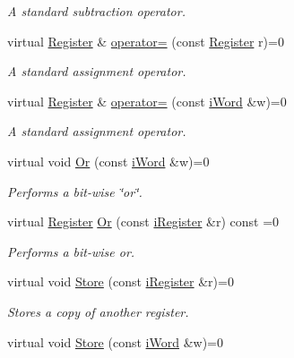 \begin{DoxyCompactItemize}
\begin{DoxyCompactList}\small\item\em A standard subtraction operator. \item\end{DoxyCompactList}\item 
virtual \hyperlink{classRegister}{Register} \& \hyperlink{classiRegister_a3280dc5af6b828d875c57c3a3eac54d9}{operator=} (const \hyperlink{classRegister}{Register} r)=0
\begin{DoxyCompactList}\small\item\em A standard assignment operator. \item\end{DoxyCompactList}\item 
virtual \hyperlink{classRegister}{Register} \& \hyperlink{classiRegister_a16bf3f305a9588ddc85c109ac9a8b47b}{operator=} (const \hyperlink{classiWord}{iWord} \&w)=0
\begin{DoxyCompactList}\small\item\em A standard assignment operator. \item\end{DoxyCompactList}\item 
virtual void \hyperlink{classiRegister_aa0eac4fe58bde4a280a42fda1c087eee}{Or} (const \hyperlink{classiWord}{iWord} \&w)=0
\begin{DoxyCompactList}\small\item\em Performs a bit-\/wise \char`\"{}or\char`\"{}. \item\end{DoxyCompactList}\item 
virtual \hyperlink{classRegister}{Register} \hyperlink{classiRegister_af5f065e89ef31d2ed40a1e80d9231bfd}{Or} (const \hyperlink{classiRegister}{iRegister} \&r) const =0
\begin{DoxyCompactList}\small\item\em Performs a bit-\/wise or. \item\end{DoxyCompactList}\item 
virtual void \hyperlink{classiRegister_ac2b021b80a890f010fc68826e29fee47}{Store} (const \hyperlink{classiRegister}{iRegister} \&r)=0
\begin{DoxyCompactList}\small\item\em Stores a copy of another register. \item\end{DoxyCompactList}\item 
virtual void \hyperlink{classiRegister_a8ffac24d1d7326e1a15f9b37cd426969}{Store} (const \hyperlink{classiWord}{iWord} \&w)=0

\end{DoxyCompactItemize}
